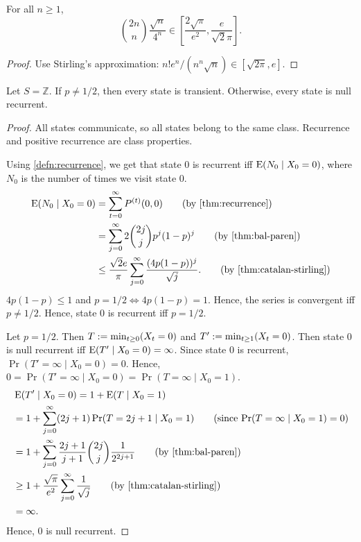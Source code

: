 \documentclass[a4paper, 12pt, fleqn]{article}
\begin{document}
\begin{lemma}
\label{thm:catalan-stirling}
For all $n \ge 1$,
\[ \binom{2n}{n}\frac{\sqrt{n}}{4^n} \in \left[\frac{2\sqrt{\pi}}{e^2}, \frac{e}{\sqrt{2}\pi}\right]. \]
\end{lemma}
\begin{proof}
Use Stirling's approximation: $n!e^n/(n^n\sqrt{n}) \in [\sqrt{2\pi}, e]$.
\end{proof}

\begin{lemma}
Let $S = \mathbb{Z}$. If $p \neq 1/2$, then every state is transient.
Otherwise, every state is null recurrent.
\end{lemma}
\begin{proof}
All states communicate, so all states belong to the same class.
Recurrence and positive recurrence are class properties.

Using \cref{defn:recurrence}, we get that state 0 is recurrent iff
$\operatorname*{E}(N_0 \mid X_0=0)$, where $N_0$ is the number of times we visit state 0.
\begin{align*}
\E(N_0 \mid X_0=0) &= \sum_{t=0}^{\infty} P^{(t)}(0,0)  \tag{by \cref{thm:recurrence}}
\\ &= \sum_{j=0}^{\infty} 2\binom{2j}{j}p^j(1-p)^j  \tag{by \cref{thm:bal-paren}}
\\ &\le \frac{\sqrt{2}e}{\pi} \sum_{j=0}^{\infty} \frac{(4p(1-p))^j}{\sqrt{j}}.
    \tag{by \cref{thm:catalan-stirling}}
\end{align*}
$4p(1-p) \le 1$ and $p = 1/2 \iff 4p(1-p) = 1$.
Hence, the series is convergent iff $p \neq 1/2$.
Hence, state 0 is recurrent iff $p = 1/2$.

Let $p = 1/2$. Then $T := \min_{t \ge 0} (X_t = 0)$
and $T' := \min_{t \ge 1} (X_t = 0)$.
Then state 0 is null recurrent iff $\operatorname*{E}(T' \mid X_0=0) = \infty$.
Since state 0 is recurrent, $\Pr(T' = \infty \mid X_0=0) = 0$.
Hence, $0 = \Pr(T' = \infty \mid X_0=0) = \Pr(T = \infty \mid X_0=1)$.
\begin{align*}
& \E(T' \mid X_0=0) = 1 + \E(T \mid X_0=1)
\\ &= 1 + \sum_{j=0}^{\infty} (2j+1)\Pr(T=2j+1 \mid X_0=1)
    \tag{since $\Pr(T = \infty \mid X_0=1) = 0$}
\\ &= 1 + \sum_{j=0}^{\infty} \frac{2j+1}{j+1} \binom{2j}{j}\frac{1}{2^{2j+1}}
    \tag{by \cref{thm:bal-paren}}
\\ &\ge 1 + \frac{\sqrt{\pi}}{e^2} \sum_{j=0}^{\infty} \frac{1}{\sqrt{j}}
    \tag{by \cref{thm:catalan-stirling}}
\\ &= \infty.
\end{align*}
Hence, 0 is null recurrent.
\end{proof}
\end{document}
